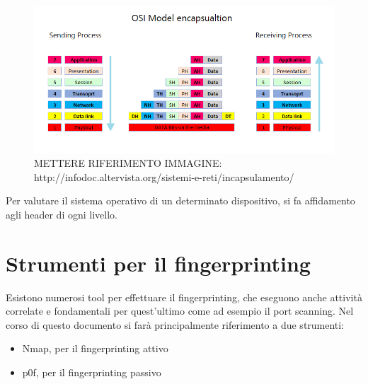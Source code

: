 \begin{figure}
	\includegraphics[width=\textwidth]{figures/incapsulamento.png}
	\caption{METTERE RIFERIMENTO IMMAGINE: http://infodoc.altervista.org/sistemi-e-reti/incapsulamento/}
	\label{incapsulamento}
\end{figure}



Per valutare il sistema operativo di un determinato dispositivo, si fa affidamento agli header di ogni livello.






\section{Strumenti per il fingerprinting}
Esistono numerosi tool per effettuare il fingerprinting, che eseguono anche attività correlate e fondamentali per quest'ultimo come ad esempio il port scanning.
Nel corso di questo documento si farà principalmente riferimento a due strumenti:
\begin{itemize}
	\item Nmap, per il fingerprinting attivo
	\item p0f, per il fingerprinting passivo
\end{itemize}


	






